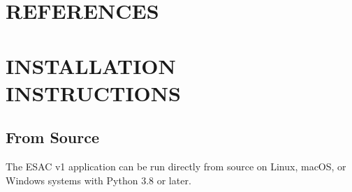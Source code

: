 \documentclass[tm]{ornltm} %
\begin{document}

\section{REFERENCES}
\printbibliography[heading=none]

\appendix
\acresetall
\section{INSTALLATION INSTRUCTIONS}
\label{app:installation}

\subsection{From Source}
\label{subsec:from_source}

The ESAC v1 application can be run directly from source on Linux, macOS, or Windows systems with Python 3.8 or later.
\end{document}
